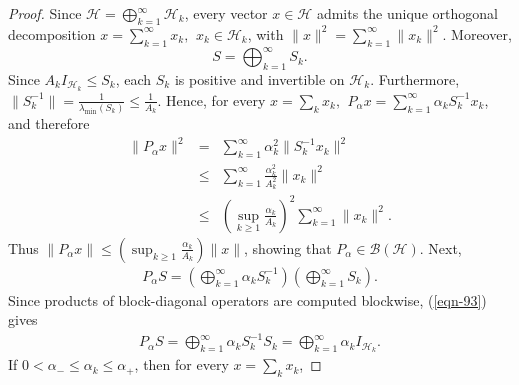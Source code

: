 \documentclass[10pt,a4paper]{amsart}
\begin{document}
\begin{proof}
Since $\mathcal H=\bigoplus_{k=1}^{\infty}\mathcal H_k$, every
vector $x\in\mathcal H$ admits the unique orthogonal decomposition
$x=\sum_{k=1}^{\infty}x_k, \,\ x_k\in\mathcal H_k$, with $\|x\|^2
= \sum_{k=1}^{\infty}\|x_k\|^2$. Moreover, $$S=
\bigoplus_{k=1}^{\infty}S_k.$$ Since $A_kI_{\mathcal H_k} \le
S_k$, each $S_k$ is positive and invertible on $\mathcal H_k$.
Furthermore, $\|S_k^{-1}\| = \frac1{\lambda_{\min}(S_k)} \le
\frac1{A_k}$. Hence, for every $x=\sum_kx_k, \,\ P_\alpha x =
\sum_{k=1}^{\infty} \alpha_kS_k^{-1}x_k$, and therefore
\begin{eqnarray*}
\|P_\alpha x\|^2 &=& \sum_{k=1}^{\infty} \alpha_k^2
\|S_k^{-1}x_k\|^2 \\ &\le& \sum_{k=1}^{\infty}
\frac{\alpha_k^2}{A_k^2} \|x_k\|^2 \\ &\le& \left( \sup_{k\ge1}
\frac{\alpha_k}{A_k} \right)^2 \sum_{k=1}^{\infty}\|x_k\|^2.
\end{eqnarray*}
Thus $\|P_\alpha x\| \le \left( \sup_{k\ge1} \frac{\alpha_k}{A_k}
\right)\|x\|$, showing that $P_\alpha\in\mathcal B(\mathcal H)$.
Next,
\begin{eqnarray} \label{eqn-93}
P_\alpha S = \left( \bigoplus_{k=1}^{\infty} \alpha_kS_k^{-1}
\right) \left( \bigoplus_{k=1}^{\infty}S_k \right).
\end{eqnarray}
Since products of block-diagonal operators are computed blockwise,
(\ref{eqn-93}) gives
\begin{eqnarray*}
P_\alpha S = \bigoplus_{k=1}^{\infty}
\alpha_kS_k^{-1}S_k=\bigoplus_{k=1}^{\infty} \alpha_kI_{\mathcal
H_k}.
\end{eqnarray*}
If $0<\alpha_-\le\alpha_k\le\alpha_+$, then for every
$x=\sum_kx_k$,


\end{proof}
\end{document}
